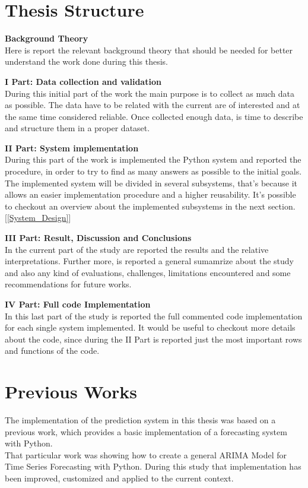 \newpage

\section{Thesis Structure}
\label{Thesis_Strucutre}
\textbf{Background Theory}\\
Here is report the relevant background theory that should be needed for better understand the work done during this thesis.

\textbf{I Part: Data collection and validation}\\
During this initial part of the work the main purpose is to collect as much data as possible. The data have to be related with the current are of interested and at the same time considered reliable. Once collected enough data, is time to describe and structure them in a proper dataset.


\textbf{II Part: System implementation}\\
During this part of the work is implemented the Python system and reported the procedure, in order to try to find as many answers as possible to the initial goals. The implemented system will be divided in several subsystems, that's because it allows an easier implementation procedure and a higher reusability. It's possible to checkout an overview about the implemented subsystems in the next section. [\ref{System_Design}]


\textbf{III Part: Result, Discussion and Conclusions }\\
In the current part of the study are reported the results and the relative interpretations. Further more, is reported a general sumamrize about the study and also any kind of evaluations, challenges, limitations encountered and some recommendations for future works.


\textbf{IV Part: Full code Implementation }	\\
In this last part of the study is reported the full commented code implementation for each single system implemented. It would be useful to checkout more details about the code, since during the II Part is reported just the most important rows and functions of the code.


\section{Previous Works}
\vspace{-5mm}
The implementation of the prediction system in this thesis was based on a previous work, which provides a basic implementation of a forecasting system with Python.\\
That particular work was showing how to create a general ARIMA Model for Time Series Forecasting with Python. During this study that implementation has been improved, customized and applied to the current context.

